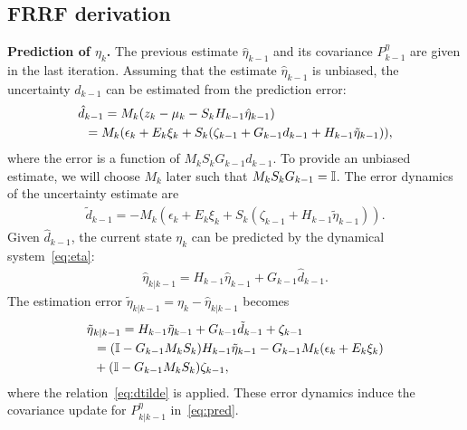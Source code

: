 \documentclass[letterpaper, 10 pt, conference]{ieeeconf}
\begin{document}
\subsection{FRRF derivation}\label{app:FRRFder}
\textbf{Prediction of $\eta_k$.}
The previous estimate $\hat{\eta}_{k-1}$ and its covariance $P_{k-1}^\eta$ are given in the last iteration.
Assuming that the estimate $\hat{\eta}_{k-1}$ is unbiased, the uncertainty $d_{k-1}$ can be estimated from the prediction error:
\begin{align}
    \hat{d}&_{k-1}= M_k(z_k -\mu_{k} - S_{k}H_{k-1}\hat{\eta}_{k-1})\nonumber\\
    & = M_k (\epsilon_k+ E_k\xi_k+S_k(\zeta_{k-1}+G_{k-1} d_{k-1}+H_{k-1}\tilde{\eta}_{k-1})),
    \label{eq:dhat}
\end{align}
where the error is a function of $M_kS_kG_{k-1} d_{k-1}$.
To provide an unbiased estimate, we will choose $M_k$ later such that $M_kS_kG_{k-1} =\mathbb{I}$. The error dynamics of the uncertainty estimate are
\begin{align}
\tilde{d}_{k-1}=-M_k (\epsilon_k+ E_k\xi_k+S_k(\zeta_{k-1}+H_{k-1}\tilde{\eta}_{k-1})).
\label{eq:dtilde}
\end{align}
Given $\hat{d}_{k-1}$, the current state $\eta_k$ can be predicted by the dynamical system~\eqref{eq:eta}:
\begin{align*}
    \hat{\eta}_{k|k-1} = H_{k-1}\hat{\eta}_{k-1}+G_{k-1}\hat{d}_{k-1}.
\end{align*}
The estimation error $\tilde{\eta}_{k|k-1}= \eta_k-\hat{\eta}_{k|k-1}$ becomes
\begin{align*}
\tilde{\eta}&_{k|k-1}
    = H_{k-1}\tilde{\eta}_{k-1}+G_{k-1} \tilde{d}_{k-1}+\zeta_{k-1}\nonumber\\    
    &=(\mathbb{I}-G_{k-1} M_kS_k)H_{k-1}\tilde{\eta}_{k-1}-G_{k-1} M_k (\epsilon_k+E_k\xi_k)\nonumber\\
    &+(\mathbb{I}-G_{k-1} M_kS_k)\zeta_{k-1},
\end{align*}
where the relation~\eqref{eq:dtilde} is applied.
These error dynamics induce the covariance update for $P_{k|k-1}^\eta$ in~\eqref{eq:pred}.
\end{document}
